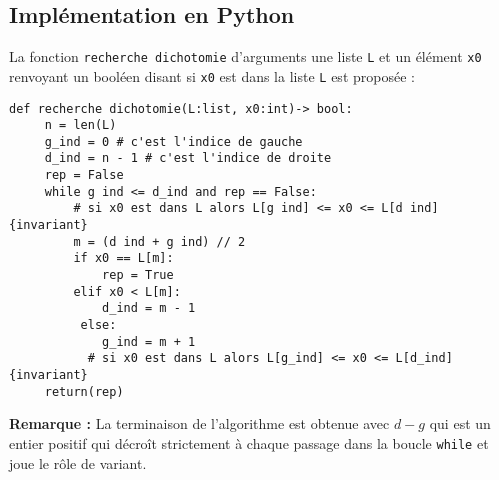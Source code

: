  

\subsection{Implémentation en Python}


La fonction \texttt{recherche dichotomie} d'arguments une liste \texttt{L} et un élément \texttt{x0} renvoyant un booléen disant si \texttt{x0} est dans la liste \texttt{L} est proposée :



\begin{lstlisting}
def recherche dichotomie(L:list, x0:int)-> bool:
     n = len(L)
     g_ind = 0 # c'est l'indice de gauche
     d_ind = n - 1 # c'est l'indice de droite
     rep = False
     while g ind <= d_ind and rep == False:
         # si x0 est dans L alors L[g ind] <= x0 <= L[d ind]     {invariant}
         m = (d ind + g ind) // 2 
         if x0 == L[m]:
             rep = True
         elif x0 < L[m]:
             d_ind = m - 1
          else:
             g_ind = m + 1
           # si x0 est dans L alors L[g_ind] <= x0 <= L[d_ind]     {invariant}
     return(rep)
\end{lstlisting} 



\textbf{Remarque :} La terminaison de l'algorithme est obtenue avec $d-g$ qui est un entier positif qui décro\^{i}t strictement à chaque passage dans la boucle \texttt{while} et joue le rôle de variant.


